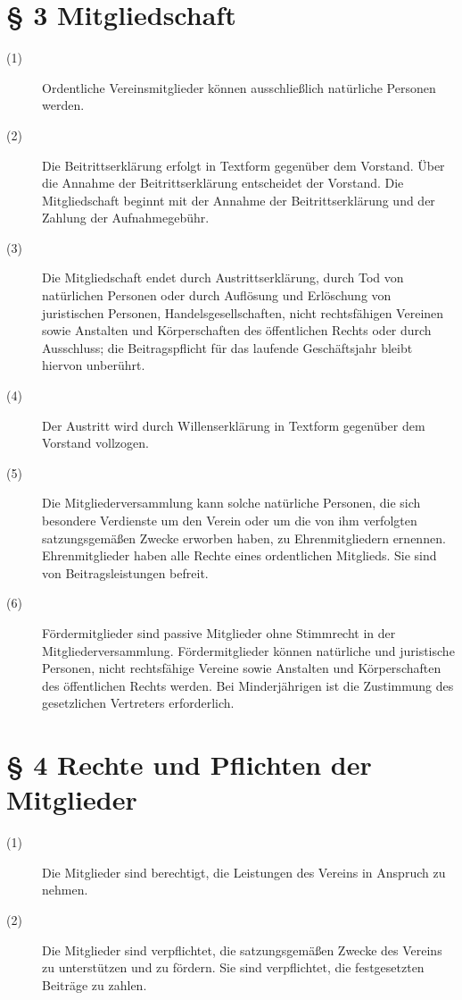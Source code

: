 \documentclass[12pt,paper=a4,ngerman]{scrreprt}
\begin{document}
\section{\S{} 3 Mitgliedschaft}
\begin{description}
\item[(1)]
Ordentliche Vereinsmitglieder können ausschließlich natürliche
Personen werden.
\item[(2)]
Die Beitrittserklärung erfolgt in Textform gegenüber dem Vorstand.
Über die Annahme der Beitrittserklärung entscheidet der Vorstand. Die
Mitgliedschaft beginnt mit der Annahme der Beitrittserklärung und der
Zahlung der Aufnahmegebühr.
\item[(3)]
Die Mitgliedschaft endet durch Austrittserklärung, durch Tod von
natürlichen Personen oder durch Auflösung und Erlöschung von
juristischen Personen, Handelsgesellschaften, nicht rechtsfähigen
Vereinen sowie Anstalten und Körperschaften des öffentlichen Rechts
oder durch Ausschluss; die Beitragspflicht für das laufende
Geschäftsjahr bleibt hiervon unberührt.
\item[(4)]
Der Austritt wird durch Willenserklärung in Textform gegenüber dem
Vorstand vollzogen.
\item[(5)]
Die Mitgliederversammlung kann solche natürliche Personen, die sich
besondere Verdienste um den Verein oder um die von ihm verfolgten
satzungsgemäßen Zwecke erworben haben, zu Ehrenmitgliedern ernennen.
Ehrenmitglieder haben alle Rechte eines ordentlichen Mitglieds. Sie
sind von Beitragsleistungen befreit.
\item[(6)]
Fördermitglieder sind passive Mitglieder ohne Stimmrecht in der
Mitgliederversammlung. Fördermitglieder können natürliche und
juristische Personen, nicht rechtsfähige Vereine sowie Anstalten und
Körperschaften des öffentlichen Rechts werden. Bei Minderjährigen ist
die Zustimmung des gesetzlichen Vertreters erforderlich.
\end{description}

\section{\S{} 4 Rechte und Pflichten der Mitglieder}
\begin{description}
\item[(1)]
Die Mitglieder sind berechtigt, die Leistungen des Vereins in Anspruch
zu nehmen.
\item[(2)]
Die Mitglieder sind verpflichtet, die satzungsgemäßen Zwecke des
Vereins zu unterstützen und zu fördern. Sie sind verpflichtet, die
festgesetzten Beiträge zu zahlen.
\end{description}
\end{document}
